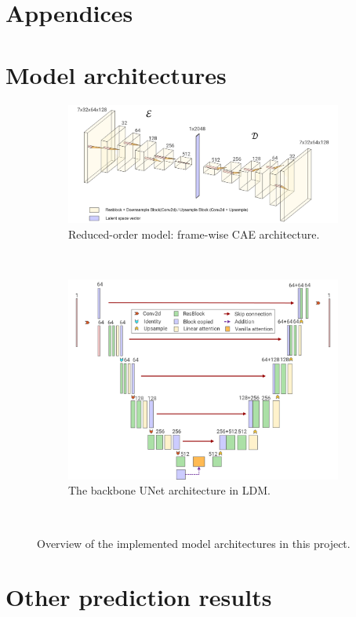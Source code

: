 \documentclass[final-report]{article-template}
\begin{document}
\newpage


\clearpage
\section*{Appendices}
\appendix
\section{Model architectures}
\begin{figure}[htbp]
    \renewcommand{\figurename}{Figure}
    \renewcommand{\thefigure}{A1}
    \centering
    \begin{subfigure}[t]{0.9\textwidth}
        \centering
        \includegraphics[width=\textwidth]{figures/model_cae.png}
        \caption{Reduced-order model: frame-wise CAE architecture.}
        \label{fig:cae}
    \end{subfigure} \\[11mm]
    \begin{subfigure}[t]{0.75\textwidth}
        \centering
        \includegraphics[width=\textwidth]{figures/model_unet.png}
        \caption{The backbone UNet architecture in LDM.}
        \label{fig:unet}
    \end{subfigure} \\[5mm]
    \caption{Overview of the implemented model architectures in this project.}
\end{figure}
\clearpage
\section{Other prediction results}
\end{document}
